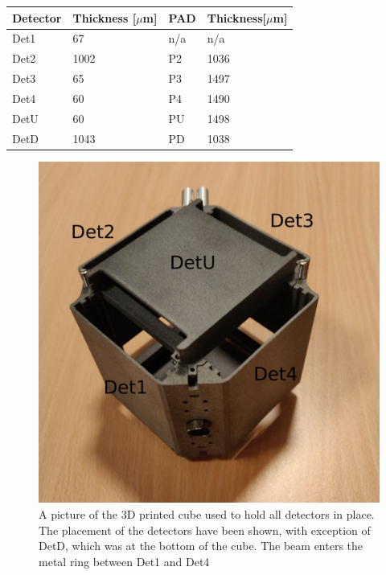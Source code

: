 \begin{table}[H]
	\centering
	\begin{tabular}{ll|ll}
		Detector & Thickness {[}$\mu$m{]} & PAD & Thickness{[}$\mu$m{]} \\ \hline
		Det1     & 67                     & n/a & n/a                   \\
		Det2     & 1002                   & P2  & 1036                  \\
		Det3     & 65                     & P3  & 1497                  \\
		Det4     & 60                     & P4  & 1490                  \\
		DetU     & 60                     & PU  & 1498                  \\
		DetD     & 1043                   & PD  & 1038                 
	\end{tabular}
\end{table}

\begin{figure}[h]
	\centering
	\includegraphics[width=.6\linewidth]{../figures/cubepic.pdf}
	\caption{A picture of the 3D printed cube used to hold all detectors in place. The placement of the detectors have been shown, with exception of DetD, which was at the bottom of the cube. The beam enters the metal ring between Det1 and Det4}
	\label{fig:cubepic}
\end{figure}

